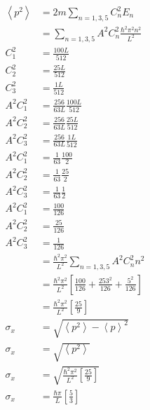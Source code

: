 \documentclass{report}
\begin{document}
\begin{align*}
  \left<p^2\right> &= 2m \sum_{n = 1, 3, 5} C_n^2 E_n\\
  &= \sum_{n = 1, 3, 5} A^2 C_n^2 \frac{\hbar^2\pi^2n^2}{L^2}\\
  C_1^2 &= \frac{100L}{512}\\
  C_2^2 &= \frac{25 L}{512}\\
  C_3^2 &= \frac{1 L}{512}\\
  A^2 C_1^2 &= \frac{256}{63 L}\frac{100L}{512}\\
  A^2 C_2^2 &= \frac{256}{63 L}\frac{25 L}{512}\\
  A^2 C_3^2 &= \frac{256}{63 L}\frac{1  L}{512}\\
  A^2 C_1^2 &= \frac{1}{63}\frac{100}{2}\\
  A^2 C_2^2 &= \frac{1}{63}\frac{25 }{2}\\
  A^2 C_3^2 &= \frac{1}{63}\frac{1  }{2}\\
  A^2 C_1^2 &= \frac{100}{126}\\
  A^2 C_2^2 &= \frac{25 }{126}\\
  A^2 C_3^2 &= \frac{1  }{126}\\
  &= \frac{\hbar^2\pi^2}{L^2}\sum_{n = 1, 3, 5} A^2 C_n^2 n^2 \\
  &= \frac{\hbar^2\pi^2}{L^2}\left[\frac{100}{126} + \frac{25 3^2}{126} + \frac{5^2}{126}\right] \\
  &= \frac{\hbar^2\pi^2}{L^2}\left[\frac{25}{9}\right] \\
  \sigma_x &= \sqrt{\left<p^2\right> - \left<p\right>^2}\\
  \sigma_x &= \sqrt{\left<p^2\right>}\\
  \sigma_x &= \sqrt{\frac{\hbar^2\pi^2}{L^2}\left[\frac{25}{9}\right] }\\
  \sigma_x &= \frac{\hbar\pi}{L}\left[\frac{5}{3}\right]\\
\end{align*}
\end{document}
